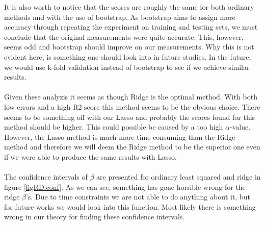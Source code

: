\documentclass[12pt]{article}
\begin{document}
It is also worth to notice that the scores are roughly the same for both ordinary methods and with the use of bootstrap. As bootstrap aims to assign more accuracy through repeating the experiment on training and testing sets, we must conclude that the original measurements were quite accurate. This, however, seems odd and bootstrap should improve on our measurements. Why this is not evident here, is something one should look into in future studies. In the future, we would use k-fold validation instead of bootstrap to see if we achieve similar results.\\ \\
Given these analyzis it seems as though Ridge is the optimal method. With both low errors and a high R2-score this method seems to be the obvious choice. There seems to be something off with our Lasso and probably the scores found for this method should be higher. This could possible be caused by a too high $\alpha$-value. However, the Lasso method is much more time consuming than the Ridge method and therefore we will deem the Ridge method to be the superior one even if we were able to produce the same results with Lasso. \\ \\
The confidence intervals of $\beta$ are presented for ordinary least squared and ridge in figure \ref{figRD:conf}. As we can see, something has gone horrible wrong for the ridge $\beta$'s. Due to time constraints we are not able to do anything about it, but for future works we would look into this function. Most likely there is something wrong in our theory for finding these confidence intervals.
\end{document}
